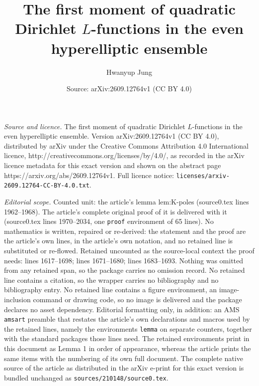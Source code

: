 \documentclass[10pt,a4paper]{amsart}
\title{The first moment of quadratic Dirichlet $L$-functions in the even hyperelliptic ensemble}
\author{Hwanyup Jung}
\date{Source: arXiv:2609.12764v1 (CC BY 4.0)}
\begin{document}
\maketitle

\noindent\emph{Source and licence.} The first moment of quadratic Dirichlet $L$-functions in the even hyperelliptic ensemble. Version arXiv:2609.12764v1 (CC BY 4.0), distributed by arXiv under the Creative Commons Attribution 4.0 International licence, http://creativecommons.org/licenses/by/4.0/, as recorded in the arXiv licence metadata for this exact version and shown on the abstract page https://arxiv.org/abs/2609.12764v1. Full licence notice: \texttt{licenses/arxiv-2609.12764-CC-BY-4.0.txt}.\par\smallskip

\noindent\textit{Editorial scope.} Counted unit: the article's lemma lem:K-poles (source0.tex lines 1962--1968). The article's complete original proof of it is delivered with it (source0.tex lines 1970--2034, one \texttt{proof} environment of 65 lines). No mathematics is written, repaired or re-derived: the statement and the proof are the article's own lines, in the article's own notation, and no retained line is substituted or re-flowed.  Retained uncounted as the source-local context the proof needs: lines 1617--1698; lines 1671--1680; lines 1683--1693.  Nothing was omitted from any retained span, so the package carries no omission record.  No retained line contains a citation, so the wrapper carries no bibliography and no bibliography entry.  No retained line contains a figure environment, an image-inclusion command or drawing code, so no image is delivered and the package declares no asset dependency.  Editorial formatting only, in addition: an AMS \texttt{amsart} preamble that restates the article's own declarations and macros used by the retained lines, namely the environments \texttt{lemma} on separate counters, together with the standard packages those lines need.  The retained environments print in this document as Lemma 1 in order of appearance, whereas the article prints the same items with the numbering of its own full document.  The complete native source of the article as distributed in the arXiv e-print for this exact version is bundled unchanged as \texttt{sources/210148/source0.tex}.
\end{document}
